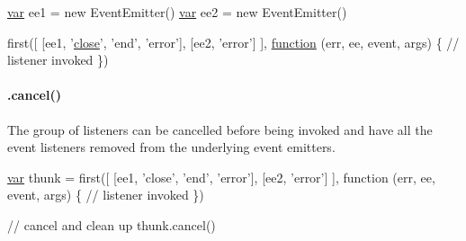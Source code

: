 \begin{DoxyCode}
\hyperlink{018__def_8c_a335628f2e9085305224b4f9cc6e95ed5}{var} ee1 = \textcolor{keyword}{new} EventEmitter()
\hyperlink{018__def_8c_a335628f2e9085305224b4f9cc6e95ed5}{var} ee2 = new EventEmitter()

first([
  [ee1, '\hyperlink{structcmd_8h_ae152484c890a24e4d9b4980e7b965be0}{close}', 'end', 'error'],
  [ee2, 'error']
], \hyperlink{class_test_a51a683fa4fcec142ab1574e00a7b6860}{function} (err, ee, event, args) \{
  \textcolor{comment}{// listener invoked}
\})
\end{DoxyCode}


\paragraph*{.cancel()}

The group of listeners can be cancelled before being invoked and have all the event listeners removed from the underlying event emitters.


\begin{DoxyCode}
\hyperlink{018__def_8c_a335628f2e9085305224b4f9cc6e95ed5}{var} thunk = first([
  [ee1, \textcolor{stringliteral}{'close'}, \textcolor{stringliteral}{'end'}, \textcolor{stringliteral}{'error'}],
  [ee2, \textcolor{stringliteral}{'error'}]
], \textcolor{keyword}{function} (err, ee, event, args) \{
  \textcolor{comment}{// listener invoked}
\})

\textcolor{comment}{// cancel and clean up}
thunk.cancel()
\end{DoxyCode}
 
